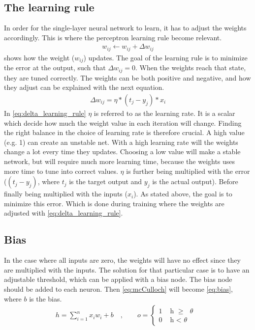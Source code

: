 \documentclass[USenglish]{ifimaster}  %
\begin{document}
\subsection{The learning rule}
In order for the single-layer neural network to learn, it has to adjust the weights accordingly. This is where the perceptron learning rule become relevant.
\begin{equation}\label{eq:learning_rule}
\begin{aligned}
w_{ij} \longleftarrow w_{ij} + \Delta w_{ij}
\end{aligned}
\end{equation}
 shows how the weight ($w_{ij}$) updates. The goal of the learning rule is to minimize the error at the output, such that $\Delta w_{ij} = 0 $. When the weights reach that state, they are tuned correctly. The weights can be both positive and negative, and how they adjust can be explained with the next equation. 
\begin{equation}\label{eq:delta_learning_rule}
\begin{aligned}
\Delta w_{ij} = \eta * (t_j - y_j) * x_i 
\end{aligned}
\end{equation}
In \cref{eq:delta_learning_rule} $\eta$ is referred to as the learning rate. It is a scalar which decide how much the weight value in each iteration will change. Finding the right balance in the choice of learning rate is therefore crucial. A high value (e.g. 1) can create an unstable net. With a high learning rate will the weights change a lot every time they updates. %
Choosing a low value will make a stable network, but will require much more learning time, because the weights uses more time to tune into correct values.
\newline
\newline
$\eta$ is further being multiplied with the error ($(t_j - y_j)$, where $t_j$ is the target output and $y_j$ is the actual output). Before finally being multiplied with the inputs ($x_i$). As stated above, the goal is to minimize this error. Which is done during training where the weights are adjusted with \cref{eq:delta_learning_rule}.
\subsection{Bias}
In the case where all inputs are zero, the weights will have no effect since they are multiplied with the inputs. The solution for that particular case is to have an adjustable threshold, which can be applied with a bias node. The bias node should be added to each neuron. Then \cref{eq:mcCulloch} will become \cref{eq:bias}, where $b$ is the bias.
\begin{equation}\label{eq:bias}
\begin{aligned}
    {h = \sum_{i=1}^{n} x_i w_i + b \quad , \quad\quad o = 
\begin{cases}
    1 & \text{ h $\geq$ $\theta$ }  \\
    0 & \text{ h < $\theta$ }
\end{cases}}
\end{aligned}
\end{equation}
\end{document}
